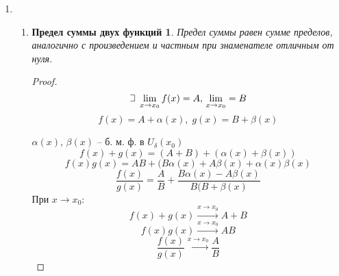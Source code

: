 \documentclass{article}
\theoremstyle{plain}
\def\letus{%
    \mathord{\setbox0=\hbox{$\exists$}%
             \hbox{\kern 0.125\wd0%
                   \vbox to \ht0{%
                      \hrule width 0.75\wd0%
                      \vfill%
                      \hrule width 0.75\wd0}%
                   \vrule height \ht0%
                   \kern 0.125\wd0}%
           }%
}
\begin{document}
\begin{enumerate}
\begin{enumerate}
\begin{enumerate}
\begin{proof}
                            $$\delta = \min{\set{{\delta_1, \delta_2}}}\implies |x - x_0| < \delta - \textbf{ сильнейшее условие}$$
                            $$\forall\, \varepsilon > 0 \rightarrow |\alpha(x)f(x)| = |\alpha(x)||f(x)| < \varepsilon B$$
                            Но по упрощай-лемме правая часть неравенста эквивалентна $\varepsilon$. 
                \end{proof}
                \item \newtheorem*{prop2*}{Теорема о сумме б. м. ф.}
                \begin{prop2*}
                 Сумма двух бесконечно малых функций есть функция бесконечно малая. Дальше по индукции очевидно.
                \end{prop2*}
                \begin{proof}
                            $$\letus{}\,\, \alpha(x), \beta(x) - \text{ б. м. ф. } при x \to x_0.$$
                            $$\exists\, \delta_1, \delta_2: |x - x_0| < \delta_1 \land |x - x_0| < \delta_2 \implies
                            |\alpha(x)| < \varepsilon \land |\beta(x)| < \varepsilon$$
                            $$\delta = \min{\set{{\delta_1, \delta_2}}}, \text{ то это условие станет сильнейшим: } |x - a| < \delta$$
                            $$\implies |\alpha(x) + \beta(x)| \le |\alpha(x)| + |\beta(x)| < 2\varepsilon$$
                            Но по упрощай-лемме правая часть неравенства эквивалентна $\varepsilon$.
                \end{proof}
            \end{enumerate}
        \end{enumerate}
        \item \begin{enumerate}
            \item \newtheorem*{sumfunc*}{Предел суммы двух функций}
            \begin{sumfunc*}
            Предел суммы равен сумме пределов, аналогично с произведением и частным при знаменателе отличным от нуля.
            \end{sumfunc*}
            \begin{proof}
                    $$\letus\; \lim_{x \to x_0}{f(x)} = A,\, \lim_{x \to x_0} = B$$
                    $$f(x) = A + \alpha(x), \; g(x) = B + \beta(x)$$
                    
                    $\alpha(x),\, \beta(x)$ -- б. м. ф. в $U_{\delta}(x_0)$
                    $$f(x) + g(x) = (A + B) + (\alpha(x) + \beta(x))$$
                    $$f(x)g(x) = AB + (B\alpha(x) + A\beta(x) + \alpha(x)\beta(x)$$
                    $$\frac{f(x)}{g(x)} = \frac{A}{B} + \frac{B\alpha(x) - A\beta(x)}{B(B + \beta(x)}$$
                     При $x \to x_0:$ 
                     $$f(x) + g(x) \xrightarrow{x \to x_0} A + B$$
                     $$f(x)g(x) \xrightarrow{x \to x_0} AB$$
                     $$\frac{f(x)}{g(x)} \xrightarrow{x \to x_0} \frac{A}{B}$$
            \end{proof}
        \end{enumerate}
\end{enumerate}
\end{document}
